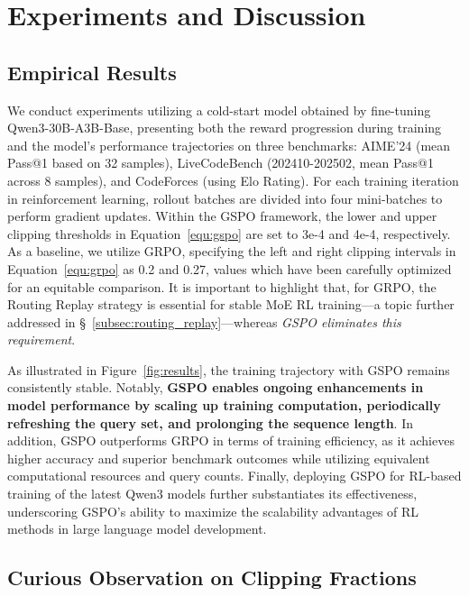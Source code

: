 \section{Experiments and Discussion}

\subsection{Empirical Results}

We conduct experiments utilizing a cold-start model obtained by fine-tuning Qwen3-30B-A3B-Base, presenting both the reward progression during training and the model's performance trajectories on three benchmarks: AIME'24 (mean Pass@1 based on 32 samples), LiveCodeBench (202410-202502, mean Pass@1 across 8 samples), and CodeForces (using Elo Rating). For each training iteration in reinforcement learning, rollout batches are divided into four mini-batches to perform gradient updates. Within the GSPO framework, the lower and upper clipping thresholds in Equation~\eqref{equ:gspo} are set to 3e-4 and 4e-4, respectively. As a baseline, we utilize GRPO, specifying the left and right clipping intervals in Equation~\eqref{equ:grpo} as 0.2 and 0.27, values which have been carefully optimized for an equitable comparison. It is important to highlight that, for GRPO, the Routing Replay strategy is essential for stable MoE RL training—a topic further addressed in \S~\ref{subsec:routing_replay}—whereas \textit{GSPO eliminates this requirement}.

As illustrated in Figure~\ref{fig:results}, the training trajectory with GSPO remains consistently stable. Notably, \textbf{GSPO enables ongoing enhancements in model performance by scaling up training computation, periodically refreshing the query set, and prolonging the sequence length}. In addition, GSPO outperforms GRPO in terms of training efficiency, as it achieves higher accuracy and superior benchmark outcomes while utilizing equivalent computational resources and query counts. Finally, deploying GSPO for RL-based training of the latest Qwen3 models further substantiates its effectiveness, underscoring GSPO’s ability to maximize the scalability advantages of RL methods in large language model development.

\subsection{Curious Observation on Clipping Fractions}

